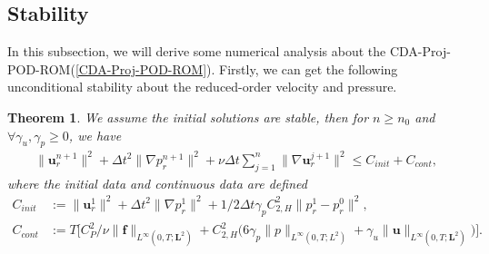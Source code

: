 \documentclass[10pt,twoside,openany,UTF8,CJK]{article}
\newtheorem{Theorem}{Theorem}[section]
\begin{document}
	\subsection{Stability}
	\indent In this subsection, we will derive some numerical analysis about the CDA-Proj-POD-ROM(\ref{CDA-Proj-POD-ROM}). Firstly, we can get the following unconditional stability about the reduced-order velocity and pressure.
	\begin{Theorem}
		We assume the initial solutions are stable, then for $n\geq n_0$ and $\forall \gamma_u,\gamma_p \geq 0$, we have
		$$
		\begin{aligned}
			\|\boldsymbol{u}_r^{n+1}\|^2 + \Delta t^2\|\nabla p^{n+1}_r\|^2 + \nu\Delta t\sum_{j=1}^{n}\|\nabla \boldsymbol{u}^{j+1}_r\|^2 \leq C_{init} + C_{cont},
		\end{aligned}
		$$
		where the initial data and continuous data are defined 
		$$
		\begin{aligned}
		C_{init} &:= \|\boldsymbol{u}_r^{1}\|^2 + \Delta t^2\|\nabla p^{1}_r\|^2 + 1/2\Delta t\gamma_p C^2_{2,H}\|p^1_r - p^0_r\|^2,  \\
		C_{cont} &:=  T\Big[C^2_{P}/\nu\|\boldsymbol{f}\|_{L^{\infty}(0,T;\boldsymbol{L}^2)} + C^2_{2,H}\Big(6\gamma_p\|p\|_{L^{\infty}(0,T;L^2)} + \gamma_u\|\boldsymbol{u}\|_{L^{\infty}(0,T;\boldsymbol{L}^2)}\Big)  \Big].
	    \end{aligned}
		$$
	\end{Theorem}
\end{document}
